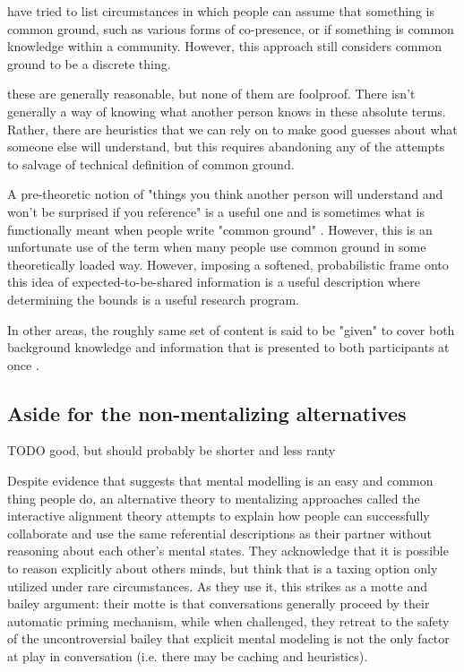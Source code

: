 \documentclass[]{article}
\begin{document}
have tried to list circumstances in which people can assume that something is common ground, such as various forms of co-presence, or if something is common knowledge within a community. However, this approach still considers common ground to be a discrete thing. 

 these are generally reasonable, but none of them are foolproof. There isn't generally a way of knowing what another person knows in these absolute terms. Rather, there are heuristics that we can rely on to make good guesses about what someone else will understand, but this requires abandoning any of the attempts to salvage of technical definition of common ground. 

A pre-theoretic notion of "things you think another person will understand and won't be surprised if you reference" is a useful one and is sometimes what is functionally meant when people write "common ground" \cite{leung2023}. However, this is an unfortunate use of the term when many people use common ground in some theoretically loaded way. However, imposing a softened, probabilistic frame onto this idea of expected-to-be-shared information is a useful description where determining the bounds is a useful research program. 

In other areas, the roughly same set of content is said to be "given" to cover both background knowledge and information that is presented to both participants at once \cite{fay2010}. 




\subsection{Aside for the non-mentalizing alternatives} 

TODO good, but should probably be shorter and less ranty

Despite evidence that suggests that mental modelling is an easy and common thing people do, an alternative theory to mentalizing approaches called the interactive alignment theory attempts to explain how people can successfully collaborate and use the same referential descriptions as their partner without reasoning about each other's mental states. They acknowledge that it is possible to reason explicitly about others minds, but think that is a taxing option only utilized under rare circumstances. As they use it, this strikes as a motte and bailey argument: their motte is that conversations generally proceed by their automatic priming mechanism, while when challenged, they retreat to the safety of the uncontroversial bailey that explicit mental modeling is not the only factor at play in conversation (i.e. there may be caching and heuristics).  
\end{document}
